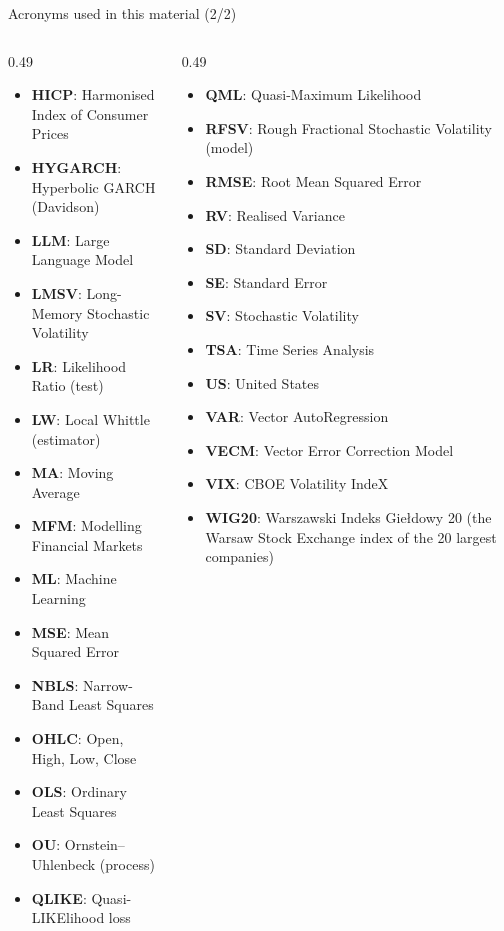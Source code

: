 \begin{frame}{Acronyms used in this material (2/2)}
\begin{columns}[T]
\begin{column}{0.49\textwidth}
\begin{itemize}\setlength{\itemsep}{0pt}
    \item \textbf{HICP}: Harmonised Index of Consumer Prices
    \item \textbf{HYGARCH}: Hyperbolic GARCH (Davidson)
    \item \textbf{LLM}: Large Language Model
    \item \textbf{LMSV}: Long-Memory Stochastic Volatility
    \item \textbf{LR}: Likelihood Ratio (test)
    \item \textbf{LW}: Local Whittle (estimator)
    \item \textbf{MA}: Moving Average
    \item \textbf{MFM}: Modelling Financial Markets
    \item \textbf{ML}: Machine Learning
    \item \textbf{MSE}: Mean Squared Error
    \item \textbf{NBLS}: Narrow-Band Least Squares
    \item \textbf{OHLC}: Open, High, Low, Close
    \item \textbf{OLS}: Ordinary Least Squares
    \item \textbf{OU}: Ornstein–Uhlenbeck (process)
    \item \textbf{QLIKE}: Quasi-LIKElihood loss
\end{itemize}
\end{column}
\begin{column}{0.49\textwidth}
\begin{itemize}\setlength{\itemsep}{0pt}
    \item \textbf{QML}: Quasi-Maximum Likelihood
    \item \textbf{RFSV}: Rough Fractional Stochastic Volatility (model)
    \item \textbf{RMSE}: Root Mean Squared Error
    \item \textbf{RV}: Realised Variance
    \item \textbf{SD}: Standard Deviation
    \item \textbf{SE}: Standard Error
    \item \textbf{SV}: Stochastic Volatility
    \item \textbf{TSA}: Time Series Analysis
    \item \textbf{US}: United States
    \item \textbf{VAR}: Vector AutoRegression
    \item \textbf{VECM}: Vector Error Correction Model
    \item \textbf{VIX}: CBOE Volatility IndeX
    \item \textbf{WIG20}: Warszawski Indeks Giełdowy 20 (the Warsaw Stock Exchange index of the 20 largest companies)
\end{itemize}
\end{column}
\end{columns}
\end{frame}
